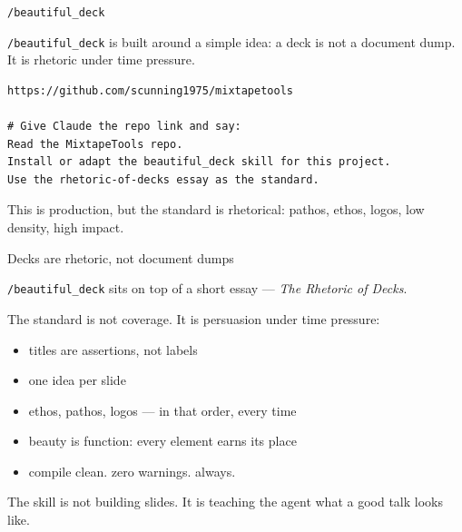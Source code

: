 \documentclass[aspectratio=169,11pt]{beamer}
\begin{document}
\begin{frame}[fragile]{\texttt{/beautiful\_deck}}

\texttt{/beautiful\_deck} is built around a simple idea: a deck is not a document dump. It is rhetoric under time pressure.

\vspace{0.25cm}

\begin{verbatim}
https://github.com/scunning1975/mixtapetools

# Give Claude the repo link and say:
Read the MixtapeTools repo.
Install or adapt the beautiful_deck skill for this project.
Use the rhetoric-of-decks essay as the standard.
\end{verbatim}

\vspace{0.2cm}

\alert{This is production, but the standard is rhetorical: pathos, ethos, logos, low density, high impact.}

\end{frame}

\begin{frame}{Decks are rhetoric, not document dumps}

\texttt{/beautiful\_deck} sits on top of a short essay --- \emph{The Rhetoric of Decks}.

\vspace{0.25cm}

The standard is not coverage. It is persuasion under time pressure:

\begin{itemize}\setlength\itemsep{0.3em}
    \item titles are assertions, not labels
    \item one idea per slide
    \item ethos, pathos, logos --- in that order, every time
    \item beauty is function: every element earns its place
    \item compile clean. zero warnings. always.
\end{itemize}

\vspace{0.3cm}

\alert{The skill is not building slides. It is teaching the agent what a good talk looks like.}

\end{frame}
\end{document}
